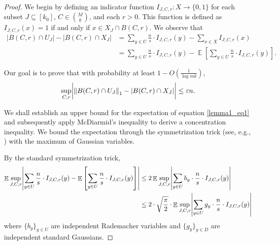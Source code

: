 \documentclass[11pt,letterpaper]{article}
\theoremstyle{definition}
\newcommand{\eps}{\varepsilon}
\DeclareMathOperator*{\E}{\ensuremath{\mathbb{E}}}
\DeclarePairedDelimiter{\abs}{\lvert}{\rvert}
\DeclarePairedDelimiter{\norm}{\lVert}{\rVert}
\begin{document}
\begin{proof}

We begin by defining an indicator function $I_{J,C,r}: X \rightarrow \{0,1\}$ for each subset $J\subseteq [k_0]$, $C\in \binom{M}{k}$,  and each $r > 0$. This function is defined as $I_{J,C,r}(x) = 1$ if and only if $x \in X_J\cap B(C,r)$.
We observe that 
\begin{align*}
|B(C,r)\cap U_J|-|B(C,r)\cap X_J| &= \sum_{y\in U} \frac{n}{s}\cdot I_{J,C,r}(y)-\sum_{x\in X} I_{J,C,r}(x) \\
&=\sum_{y\in U} \frac{n}{s}\cdot I_{J,C,r}(y) - \E\left[ \sum_{y\in U} \frac{n}{s}\cdot I_{J,C,r}(y)\right].
\end{align*}

Our goal is to prove that with probability at least $1-O(\frac{1}{\log mk})$,
\begin{equation} \label{lemma1_eq1}
\sup_{C,r} \abs[\bigg]{ \norm*{B(C,r)\cap U_J}_1 - |B(C,r)\cap X_J| } \leq \eps n.
\end{equation}

We shall establish an upper bound for the expectation of equation \eqref{lemma1_eq1} and subsequently apply McDiarmid's inequality to derive a concentration inequality.
 We bound the expectation through the symmetrization trick (see, e.g., \cite[p153]{LT91}) with the maximum of Gaussian variables.


By the standard symmetrization trick,
\begin{align*}
\E\sup_{J,C,r} \abs*{ \sum_{y\in U} \frac{n}{s}\cdot I_{J,C,r}(y)-\E \left[ \sum_{y\in U} \frac{n}{s}\cdot I_{J,C,r}(y)\right] } 
&\leq 2\E\sup_{J,C,r} \abs*{ \sum_{y\in U} b_y\cdot \frac{n}{s}\cdot I_{J,C,r}(y) } \\
&\leq 2\cdot \sqrt{\frac{\pi}{2}} \cdot \E\sup_{J,C,r} \abs*{ \sum_{y\in U} g_y\cdot \frac{n}{s}\cdot I_{J,C,r}(y) }
\end{align*}
where $\{b_y\}_{y\in U}$ are independent Rademacher variables and $\{g_y\}_{y\in D}$ are independent standard Gaussians.


\end{proof}
\end{document}

